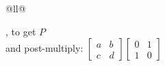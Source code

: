 \documentclass[../main.tex]{subfiles}
\begin{document}
\begin{tabular}{@{}ll@{}}
{\begin{gmatrix}[b]
        \end{gmatrix}
        \), to get \(P\)               \\
        and post-multiply:
        \(
        \begin{bmatrix}
            a & b \\
            c & d
        \end{bmatrix}
        \begin{bmatrix}
            0 & 1 \\
            1 & 0
        \end{bmatrix}
        \)
    }                                  \\
    \brule
\end{tabular}


\end{document}
